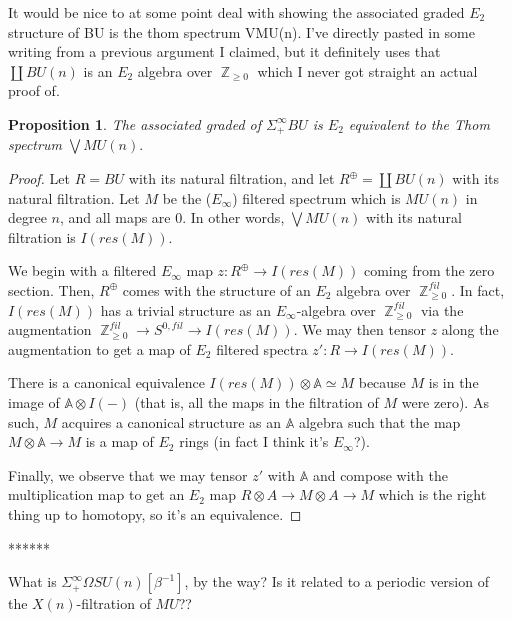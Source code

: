 \documentclass[reqno, oneside]{amsart}
\theoremstyle{definition}
\theoremstyle{plain}
\newtheorem{prop}[nul]{Proposition}
\DeclareMathOperator{\Z}{\mathbb{Z}}
\begin{document}
It would be nice to at some point deal with showing the associated graded $E_2$ structure of BU is the thom spectrum VMU(n).  I've directly pasted in some writing from a previous argument I claimed, but it definitely uses that $\coprod BU(n)$ is an $E_2$ algebra over $\Z _{\geq 0}$ which I never got straight an actual proof of.  

\begin{prop}The associated graded of $\Sigma^{\infty}_+BU$ is $E_2$ equivalent to the Thom spectrum $\bigvee MU(n).$
\end{prop}
\begin{proof}
Let $R = BU$ with its natural filtration, and let $R^{\oplus} = \coprod BU(n)$ with its natural filtration.  Let $M$ be the ($E_\infty$) filtered spectrum which is $MU(n)$ in degree $n$, and all maps are $0$.  In other words, $\bigvee MU(n)$ with its natural filtration is $I(res(M))$.  

We begin with a filtered $E_\infty$ map $z:R^\oplus \to I(res(M))$ coming from the zero section.  Then, $R^\oplus$ comes with the structure of an $E_2$ algebra over $\Z_{\geq 0}^{fil}$.  In fact, $I(res(M))$  has a trivial structure as an $E_\infty$-algebra over $\Z_{\geq 0}^{fil}$ via the augmentation $\Z_{\geq 0}^{fil}\to S^{0,fil} \to I(res(M))$.  We may then tensor $z$ along the augmentation to get a map of $E_2$ filtered spectra $z':R \to I(res(M))$.  

There is a canonical equivalence $I(res(M)) \otimes \mathbb{A} \simeq M$ because $M$ is in the image of $\mathbb{A} \otimes I(-)$ (that is, all the maps in the filtration of $M$ were zero).  As such, $M$ acquires a canonical structure as an $\mathbb{A}$ algebra such that the map $M \otimes \mathbb{A} \to M$ is a map of $E_2$ rings (in fact I think it's $E_\infty$?).  

Finally, we observe that we may tensor $z'$ with $\mathbb{A}$ and compose with the multiplication map to get an $E_2$ map $R\otimes A \to M \otimes A \to M$ which is the right thing up to homotopy, so it's an equivalence.  
\end{proof}

******  

What is $\Sigma^{\infty}_+ \Omega SU(n)[\beta^{-1}]$, by the way?  Is it related to a periodic version of the $X(n)$-filtration of $MU$??



\end{document}
